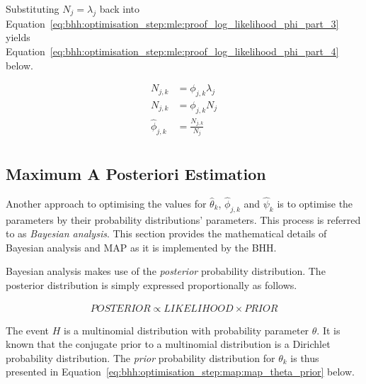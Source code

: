 Substituting $N_{j} = \lambda_{j}$ back into Equation~\eqref{eq:bhh:optimisation_step:mle:proof_log_likelihood_phi_part_3} yields Equation~\eqref{eq:bhh:optimisation_step:mle:proof_log_likelihood_phi_part_4} below.

\begin{equation}
      \label{eq:bhh:optimisation_step:mle:proof_log_likelihood_phi_part_4}
      \begin{split}
            N_{j,k} &= \phi_{j,k} \lambda_{j} \\
            N_{j,k} &= \phi_{j,k} N_{j} \\
            \hat{\phi}_{j,k} &= \frac{N_{j,k}}{N_{j}}\\
      \end{split}
\end{equation}

\subsection{Maximum A Posteriori Estimation}\label{sec:bhh:optimisation_step:map}

Another approach to optimising the values for $\hat{\theta}_{k}$, $\hat{\phi}_{j,k}$ and $\hat{\psi}_{k}$ is to optimise the parameters by their probability distributions' parameters. This process is referred to as \textit{Bayesian analysis}. This section provides the mathematical details of Bayesian analysis and \acf{MAP} as it is implemented by the \acs{BHH}.

Bayesian analysis makes use of the \textit{posterior} probability distribution. The posterior distribution is simply expressed proportionally as follows.

\begin{equation}
      \label{eq:bhh:optimisation_step:map:bayesian_analysis_lamens}
      \begin{split}
            POSTERIOR \propto LIKELIHOOD \times PRIOR
      \end{split}
\end{equation}

The event $H$ is a multinomial distribution with probability parameter $\theta$. It is known that the conjugate prior to a multinomial distribution is a Dirichlet probability distribution. The \textit{prior} probability distribution for $\theta_{k}$ is thus presented in Equation~\eqref{eq:bhh:optimisation_step:map:map_theta_prior} below.

